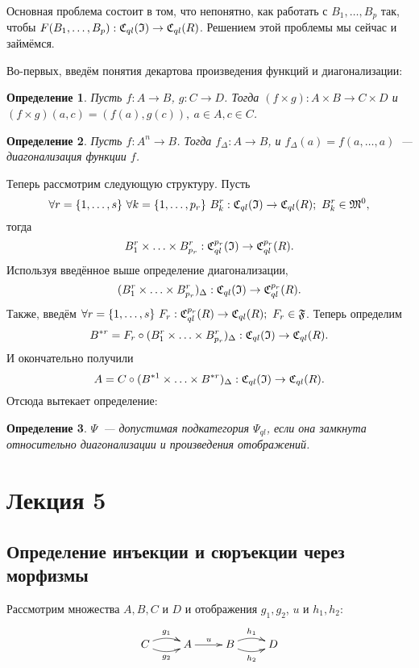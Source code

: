 \documentclass[a4paper, 12pt]{report}
\newtheorem{definition}{Определение}[chapter]
\begin{document}
Основная проблема состоит в том, что непонятно, как работать с $B_1,\ldots, B_p$ так, чтобы $F(B_1,\ldots, B_p): \mathfrak{C}_{ql}(\mathfrak{I})\rightarrow \mathfrak{C}_{ql}(R)$. Решением этой проблемы мы сейчас и займёмся.

Во-первых, введём понятия декартова произведения функций и диагонализации:
\begin{definition}
Пусть $f: A\rightarrow B$, $g: C\rightarrow D$. Тогда $(f\times g): A\times B\rightarrow C\times D$ и $(f\times g) (a, c) = (f(a), g(c)),\ a\in A, c\in C$.
\end{definition}
\begin{definition}
Пусть $f: A^n\rightarrow B$. Тогда $f_{\Delta}: A\rightarrow B$, и $f_{\Delta}(a) = f(a,\ldots, a)$~--- диагонализация функции $f$.
\end{definition}

Теперь рассмотрим следующую структуру.
Пусть
\[
\forall r=\{1,\ldots, s\}\ \forall k=\{1, \ldots, p_r \} \ B_k^r: \Cql(\frakI)\rightarrow\Cql(R);\ B_k^r\in\frakM^0,
\]
тогда
\[
B_1^r\times\ldots\times B_{p_r}^r: \mathfrak{C}_{ql}^{p_r}(\mathfrak{I})\rightarrow \mathfrak{C}_{ql}^{p_r}(R).
\]
Используя введённое выше определение диагонализации,
\[
(B_1^r\times\ldots\times B_{p_r}^r)_{\Delta}: \mathfrak{C}_{ql}(\mathfrak{I})\rightarrow \mathfrak{C}_{ql}^{p_r}(R).
\]
Также, введём $\forall r=\{1,\ldots, s\}\ F_r: \mathfrak{C}_{ql}^{p_r}(R) \rightarrow \mathfrak{C}_{ql}(R);\ F_r \in \mathfrak{F}$. Теперь определим
\[
B^{*r} = F_r\circ(B_1^r\times\ldots\times B_{p_r}^r)_{\Delta}: \mathfrak{C}_{ql}(\mathfrak{I})\rightarrow\mathfrak{C}_{ql}(R).
\]
И окончательно получили
\[
A = C\circ(B^{*1}\times\ldots\times B^{*r})_{\Delta}: \mathfrak{C}_{ql}(\mathfrak{I})\rightarrow \mathfrak{C}_{ql}(R).
\]
Отсюда вытекает определение:
\begin{definition}
$\Psi$~--- допустимая подкатегория $\Psi_{ql}$, если она замкнута относительно диагонализации и произведения отображений.
\end{definition}


\chapter{Лекция 5}
\section{Определение инъекции и сюръекции через морфизмы}

Рассмотрим множества $A, B, C$ и $D$ и отображения $g_1, g_2$, $u$ и $h_1, h_2$:
\begin{equation*}
\xymatrix{
C\ar@/^/[r]^{g_1}\ar@/_/[r]_{g_2} & A\ar[r]^u & B\ar@/^/[r]^{h_1}\ar@/_/[r]_{h_2} & D
}
\end{equation*}
\end{document}
